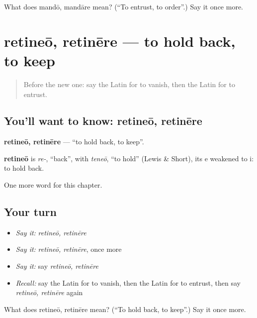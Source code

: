 \begin{tcolorbox}[breakable,colback=teal!4,colframe=teal!35!black,title={Before you move on}]
What does mandō, mandāre mean? (\textquotedblleft{}To entrust, to order\textquotedblright{}.) Say it once more.
\end{tcolorbox}
\section[retineō, retinēre]{retineō, retinēre — to hold back, to keep}

\label{lesson:LA-C234-retineo}



\begin{quote}
Before the new one: say the Latin for to vanish, then the Latin for to entrust.
\end{quote}

\subsection*{You'll want to know: retineō, retinēre}
\textbf{retineō, retinēre} — \textquotedblleft{}to hold back, to keep\textquotedblright{}.

\begin{cousinweb}
\textbf{retineō} is \emph{re-}, \textquotedblleft{}back\textquotedblright{}, with \emph{teneō}, \textquotedblleft{}to hold\textquotedblright{} (Lewis \& Short), its e weakened to i: to hold back.
\end{cousinweb}

\begin{grammarlens}[title={What you've built}]
One more word for this chapter.
\end{grammarlens}

\subsection*{Your turn}
\begin{itemize}
\raggedright
  \item \emph{Say it:} \emph{retineō, retinēre}
  \item \emph{Say it:} \emph{retineō, retinēre}, once more
  \item \emph{Say it:} say \emph{retineō, retinēre}
  \item \emph{Recall:} say the Latin for to vanish, then the Latin for to entrust, then say \emph{retineō, retinēre} again
\end{itemize}

\begin{tcolorbox}[breakable,colback=teal!4,colframe=teal!35!black,title={Before you move on}]
What does retineō, retinēre mean? (\textquotedblleft{}To hold back, to keep\textquotedblright{}.) Say it once more.
\end{tcolorbox}
